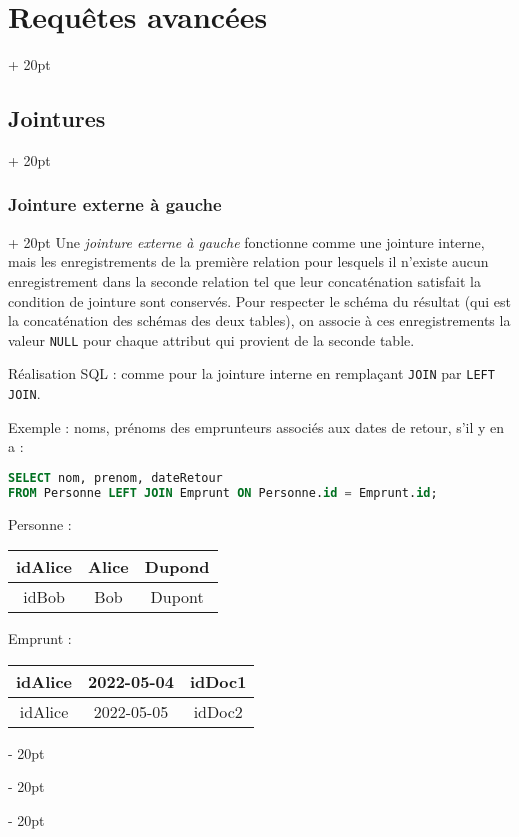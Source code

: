 \documentclass[a4paper, 12pt, twoside]{article}
\newcommand{\ind}[1][20pt]{\advance\leftskip + #1}
\newcommand{\deind}[1][20pt]{\advance\leftskip - #1}
\newenvironment{indt}[2][20pt]{#2 \par \ind[#1]}{\par \deind} %
\begin{document}
\begin{indt}{\section{Requêtes avancées}}
\begin{indt}{\subsection{Jointures}}
            \vspace{12pt}
            
            \begin{indt}{\subsubsection{Jointure externe à gauche}}
                Une \textit{jointure externe à gauche} fonctionne comme une jointure interne, mais les enregistrements de la première relation pour lesquels il n'existe aucun enregistrement dans la seconde relation tel que leur concaténation satisfait la condition de jointure sont conservés. Pour respecter le schéma du résultat (qui est la concaténation des schémas des deux tables), on associe à ces enregistrements la valeur \texttt{NULL} pour chaque attribut qui provient de la seconde table.

                Réalisation SQL : comme pour la jointure interne en remplaçant \texttt{JOIN} par \texttt{LEFT JOIN}.

                \vspace{12pt}
                
                Exemple : noms, prénoms des emprunteurs associés aux dates de retour, s'il y en a :

                \begin{lstlisting}[language=SQL, xleftmargin=80pt]
SELECT nom, prenom, dateRetour
FROM Personne LEFT JOIN Emprunt ON Personne.id = Emprunt.id;\end{lstlisting}

                \vspace{6pt}
                
                Personne :
                \begin{tabular}{|c|c|c|}
                    \hline
                    idAlice & Alice & Dupond
                    \\
                    \hline
                    idBob & Bob & Dupont
                    \\
                    \hline
                \end{tabular}

                Emprunt :
                \begin{tabular}{|c|c|c|}
                    \hline
                    idAlice & 2022-05-04 & idDoc1
                    \\
                    \hline
                    idAlice & 2022-05-05 & idDoc2
                    \\
                    \hline
                \end{tabular}


\end{indt}
\end{indt}
\end{indt}
\end{document}
